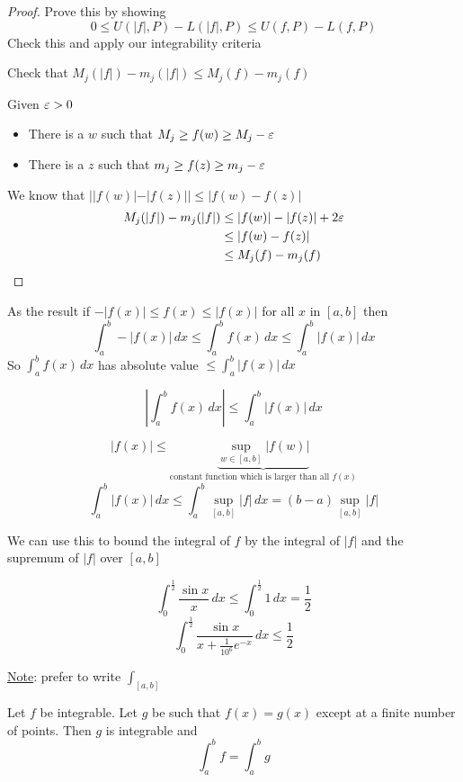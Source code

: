 \begin{proof}
  Prove this by showing
  \[0 \le U(|f|, P) - L(|f|, P) \le U(f, P) - L(f, P)\]
  Check this and apply our integrability criteria

  Check that $M_j(|f|) - m_j(|f|) \le M_j(f) - m_j(f)$

  Given $\varepsilon > 0$ 
  \begin{itemize}
    \item There is a $w$ such that $M_j \ge f(w) \ge M_j- \varepsilon$
    \item There is a $z$ such that $m_j \ge f(z) \ge m_j- \varepsilon$
  \end{itemize}
  We know that $||f(w)| - |f(z)|| \le |f(w) - f(z)|$
  \begin{align*}
  M_j(|f|) - m_j(|f|) &\le |f(w)| - |f(z)| + 2\varepsilon \\
  &\le |f(w) - f(z)| \\
  &\le M_j(f) - m_j(f) \\
  \end{align*}
\end{proof}

As the result if
$-|f(x)| \le f(x) \le |f(x)|$ for all $x$ in $[a, b]$ then 
\[\int_a^b -|f(x)| \,dx \le \int_a^b f(x) \,dx \le \int_a^b |f(x)| \,dx\] 
So $\displaystyle\int_a^b f(x) \,dx$ has absolute value $\displaystyle\le \int_a^b |f(x)| \,dx$

\[\left|\int_a^b f(x) \,dx\right|\le\int_a^b |f(x)|\,dx\]

\[|f(x)| \le \underbrace{\sup_{w \in [a, b]} |f(w)|}_{\text{constant function which is larger than all }f(x)}\]
\[\int_a^b |f(x)| \,dx \le \int_a^b \sup_{[a, b]}|f| \,dx = (b-a) \sup_{[a, b]} |f| \]

We can use this to bound the integral of $f$ by the integral of $|f|$ and the supremum of $|f|$ over $[a, b]$

\begin{example*}
  \[\int_0^{\frac{1}{2}} \frac{\sin x}{x} \,dx \le \int_0^{\frac{1}{2}} 1 \,dx = \frac{1}{2} \]
  \[\int_0^{\frac{1}{2}} \frac{\sin x}{x + \frac{1}{10^6}e^{-x}} \,dx \le \frac{1}{2} \]
\end{example*}

\underline{Note}: prefer to write $\displaystyle\int_{[a, b]}$

\begin{theorem*}[Exercise]
  Let $f$ be integrable. Let $g$ be such that $f(x) = g(x)$ except at a finite number of points. 
  Then $g$ is integrable and 
  \[\int_a^b f = \int_a^b g\]
\end{theorem*}

